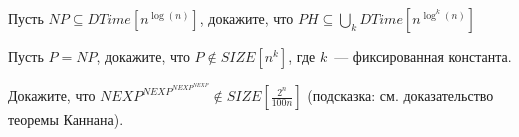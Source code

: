 \begin{ptask}{45}
    Пусть $NP \subseteq DTime[n^{\log(n)}]$, докажите, что $PH \subseteq \bigcup\limits_{k}DTime[n^{\log^k(n)}]$
\end{ptask}


\begin{ptask}{48}
    Пусть $P = NP$, докажите, что $P \notin SIZE[n^k]$, где $k$~--- фиксированная константа.
\end{ptask}

\begin{ptask}{49}
    Докажите, что $NEXP^{NEXP^{NEXP^{NEXP}}} \notin SIZE[\frac{2^n}{100n}]$ (подсказка: см. доказательство теоремы Каннана).
\end{ptask}
